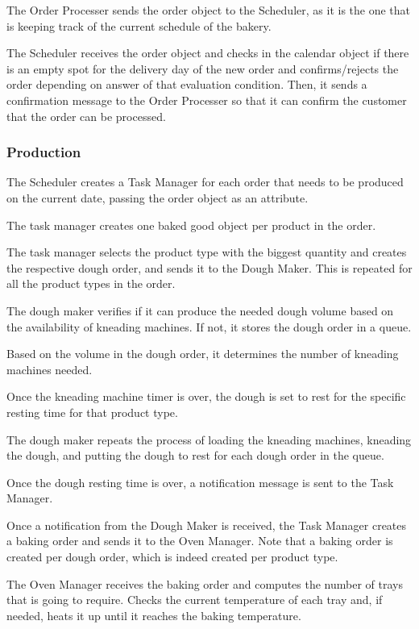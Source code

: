 \documentclass[a4paper]{article}
\begin{document}
	The Order Processer sends the order object to the Scheduler, as it is the one that is keeping track of the current schedule of the bakery.
	
	The Scheduler receives the order object and checks in the calendar object if there is an empty spot for the delivery day of the new order and confirms/rejects the order depending on answer of that evaluation condition. Then, it sends a confirmation message to the Order Processer so that it can confirm the customer that the order can be processed. 
	
	\subsubsection{Production}
	
	The Scheduler creates a Task Manager for each order that needs to be produced on the current date, passing the order object as an attribute. 
	
	The task manager creates one baked good object per product in the order. 
	
	The task manager selects the product type with the biggest quantity and creates the respective dough order, and sends it to the Dough Maker. This is repeated for all the product types in the order.
	
	The dough maker verifies if it can produce the needed dough volume based on the availability of kneading machines. If not, it stores the dough order in a queue. 
	
	Based on the volume in the dough order, it determines the number of kneading machines needed.
	
	Once the kneading machine timer is over, the dough is set to rest for the specific resting time for that product type. 
	
	The dough maker repeats the process of loading the kneading machines, kneading the dough, and putting the dough to rest for each dough order in the queue.
	
	Once the dough resting time is over, a notification message is sent to the Task Manager.
	
	Once a notification from the Dough Maker is received, the Task Manager creates a baking order and sends it to the Oven Manager. Note that a baking order is created per dough order, which is indeed created per product type.
	
	The Oven Manager receives the baking order and computes the number of trays that is going to require. Checks the current temperature of each tray and, if needed, heats it up until it reaches the baking temperature. 
	
\end{document}
